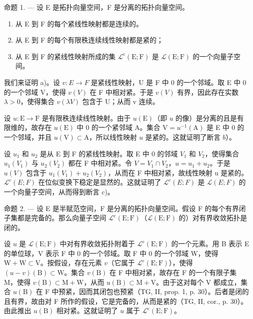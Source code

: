 命题 1. --- 设 E 是拓扑向量空间，F 是分离的拓扑向量空间。

\begin{enumerate}
\def\labelenumi{\alph{enumi})}
\item
  从 E 到 F 的每个紧线性映射都是连续的。
\item
  从 E 到 F 的每个有限秩连续线性映射都是紧的；
\item
  从 E 到 F 的紧线性映射所成的集 \(\mathcal{L}^{\mathrm{c}}(\mathrm{E};\mathrm{F})\) 是 \(\mathcal{L}(\mathrm{E};\mathrm{F})\) 的一个向量子空间。
\end{enumerate}

我们来证明 a)。设 \(v: E \rightarrow F\) 是紧线性映射，U 是 F 中 0 的一个邻域。取 E 中 0 的一个邻域 V，使得 \(v(V)\) 在 F 中相对紧。于是 \(v(V)\) 有界，因此存在实数 \(\lambda > 0\)，使得集合 \(v(\lambda V)\) 包含于 U；从而 v 连续。

设 \(u \colon \mathrm{E} \to \mathrm{F}\) 是有限秩连续线性映射。由于 \(u(\mathrm{E})\)（即 \(u\) 的像）是分离的且是有限维的，故存在 \(u(\mathrm{E})\) 中 0 的一个紧邻域 A。集合 \(\mathrm{V} = u^{-1}(\mathrm{A})\) 是 E 中 0 的一个邻域，并且 \(u(\mathrm{V}) \subset \mathrm{A}\)，所以线性映射 \(u\) 是紧的。这就证明了断言 \(b\)）。

设 \(u_{1}\) 和 \(u_{2}\) 是从 E 到 F 的紧线性映射。取 E 中 0 的邻域 \(V_{1}\) 和 \(V_{2}\)，使得集合 \(u_{1}(V_{1})\) 与 \(u_{2}(V_{2})\) 都在 F 中相对紧。令 \(V = V_{1} \cap V_{2}\)，\(u = u_{1} + u_{2}\)。于是 \(u(V)\) 包含于 \(u_{1}(V_{1}) + u_{2}(V_{2})\)，从而在 F 中相对紧，故线性映射 u 是紧的。\(\mathcal{L}^{c}(E;F)\) 在位似变换下稳定是显然的。这就证明了 \(\mathcal{L}^{c}(E;F)\) 是 \(\mathcal{L}(E;F)\) 的一个向量子空间，从而得到断言 c)。

命题 2. --- 设 E 是半赋范空间，F 是分离的拓扑向量空间。假设 F 的每个有界闭子集都是完备的。那么向量子空间 \(\mathcal{L}^{\mathrm{c}}(\mathrm{E};\mathrm{F})\)（\(\mathcal{L}(\mathrm{E};\mathrm{F})\) 的）对有界收敛拓扑是闭的。

设 \(u\) 是 \(\mathcal{L}(\mathrm{E};\mathrm{F})\) 中对有界收敛拓扑附着于 \(\mathcal{L}^{\mathrm{c}}(\mathrm{E};\mathrm{F})\) 的一个元素。用 B 表示 E 的单位球，V 表示 F 中 0 的一个邻域。取 F 中 0 的一个邻域 W，使得 \(\mathrm{W} + \mathrm{W} \subset \mathrm{V}\)。按假设，存在元素 \(v\)（它属于 \(\mathcal{L}^{\mathrm{c}}(\mathrm{E};\mathrm{F})\)），使得 \((u - v)(\mathrm{B}) \subset \mathrm{W}\)。集合 \(v(\mathrm{B})\) 在 F 中相对紧，故存在 F 的一个有限子集 M，使得 \(v(\mathrm{B}) \subset \mathrm{M} + \mathrm{W}\)，从而 \(u(\mathrm{B}) \subset \mathrm{M} + \mathrm{V}\)。由于这对每个 V 都成立，集合 \(u(\mathrm{B})\) 在 F 中预紧，因而其闭包也预紧（TG, II, prop. 1, p. 30）。后者是闭的且有界，故由对 F 所作的假设，它是完备的，从而是紧的（TG, II, cor., p. 30）。由此推出 \(u(\mathrm{B})\) 相对紧。这就证明了 \(u\) 属于 \(\mathcal{L}^{\mathrm{c}}(\mathrm{E};\mathrm{F})\)。

